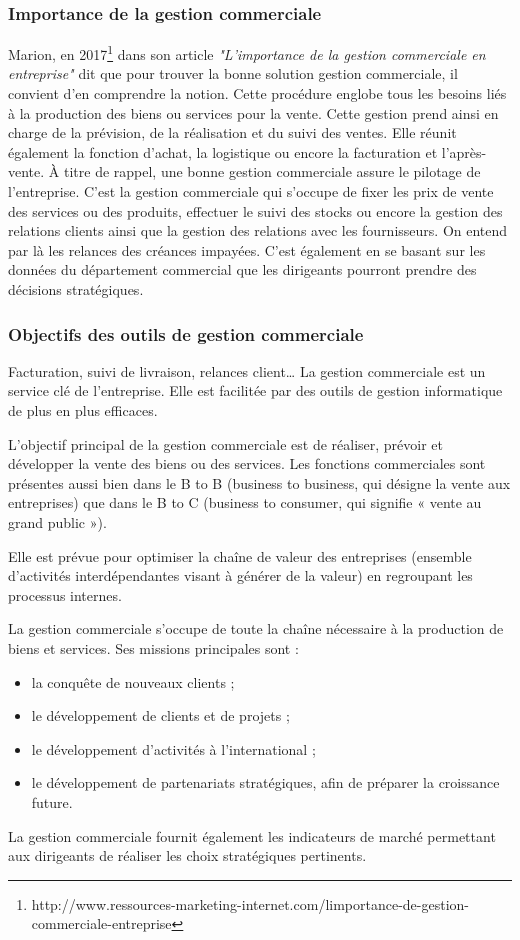 \subsubsection{Importance de la gestion commerciale}
Marion, en 2017\footnote{http://www.ressources-marketing-internet.com/limportance-de-gestion-commerciale-entreprise} dans son article \textit{"L’importance de la gestion commerciale en entreprise"} dit que pour trouver la bonne solution gestion commerciale, il convient d’en comprendre la notion. Cette procédure englobe tous les besoins liés à la production des biens ou services pour la vente. Cette gestion prend ainsi en charge de la prévision, de la réalisation et du suivi des ventes. Elle réunit également la fonction d’achat, la logistique ou encore la facturation et l’après-vente. À titre de rappel, une bonne gestion commerciale assure le pilotage de l’entreprise. C’est la gestion commerciale qui s’occupe de fixer les prix de vente des services ou des produits, effectuer le suivi des stocks ou encore la gestion des relations clients ainsi que la gestion des relations avec les fournisseurs. On entend par là les relances des créances impayées. C’est également en se basant sur les données du département commercial que les dirigeants pourront prendre des décisions stratégiques. 

\subsubsection{Objectifs des outils de gestion commerciale}
Facturation, suivi de livraison, relances client… La gestion commerciale est un service clé de l’entreprise. Elle est facilitée par des outils de gestion informatique de plus en plus efficaces.

L'objectif principal de la gestion commerciale est de réaliser, prévoir et développer la vente des biens ou des services. Les fonctions commerciales sont présentes aussi bien dans le B to B (business to business, qui désigne la vente aux entreprises) que dans le B to C (business to consumer, qui signifie « vente au grand public »).

Elle est prévue pour optimiser la chaîne de valeur des entreprises (ensemble d'activités interdépendantes visant à générer de la valeur) en regroupant les processus internes.

La gestion commerciale s’occupe de toute la chaîne nécessaire à la production de biens et services. Ses missions principales sont :
\begin{itemize}
    \item la conquête de nouveaux clients ;
    \item le développement de clients et de projets ;
    \item le développement d’activités à l’international ;
    \item le développement de partenariats stratégiques, afin de préparer la croissance future.
\end{itemize}
La gestion commerciale fournit également les indicateurs de marché permettant aux dirigeants de réaliser les choix stratégiques pertinents.

